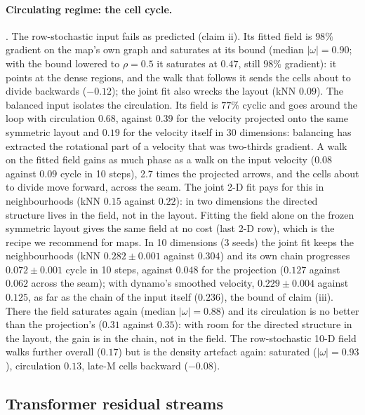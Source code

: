 \paragraph{Circulating regime: the cell cycle.}
. The row-stochastic input fails as predicted
(claim ii). Its fitted field is $98\%$ gradient on the map's own graph and
saturates at its bound (median $|\omega|=0.90$; with the bound lowered to
$\rho=0.5$ it saturates at $0.47$, still $98\%$ gradient): it points at
the dense regions, and the walk that follows it sends the cells about to
divide backwards ($-0.12$); the joint fit also wrecks the layout (kNN
$0.09$). The balanced input isolates the circulation. Its field is $77\%$
cyclic and goes around the loop with circulation $0.68$, against $0.39$
for the velocity projected onto the same symmetric layout and $0.19$ for
the velocity itself in 30 dimensions: balancing has extracted the
rotational part of a velocity that was two-thirds gradient. A walk on the
fitted field gains as much phase as a walk on the input velocity ($0.08$
against $0.09$ cycle in 10 steps), 2.7 times the projected arrows, and
the cells about to divide move forward, across the seam. The joint 2-D fit
pays for this in neighbourhoods (kNN $0.15$ against $0.22$): in two
dimensions the directed structure lives in the field, not in the layout.
Fitting the field alone on the frozen symmetric layout gives the same
field at no cost (last 2-D row), which is the recipe we recommend for
maps. In 10 dimensions (3 seeds) the joint fit keeps the neighbourhoods
(kNN $0.282 \pm 0.001$ against $0.304$) and its own chain progresses
$0.072 \pm 0.001$ cycle in 10 steps, against $0.048$ for the projection
($0.127$ against $0.062$ across the seam); with dynamo's smoothed
velocity, $0.229 \pm 0.004$ against $0.125$, as far as the chain of the
input itself ($0.236$), the bound of claim (iii). There the field
saturates again (median $|\omega| = 0.88$) and its circulation is no
better than the projection's ($0.31$ against $0.35$): with room for the
directed structure in the layout, the gain is in the chain, not in the
field. The row-stochastic 10-D field walks further overall ($0.17$) but
is the density artefact again: saturated ($|\omega| = 0.93$), circulation
$0.13$, late-M cells backward ($-0.08$).

\subsection{Transformer residual streams}
\label{sec:exp_transformer}

